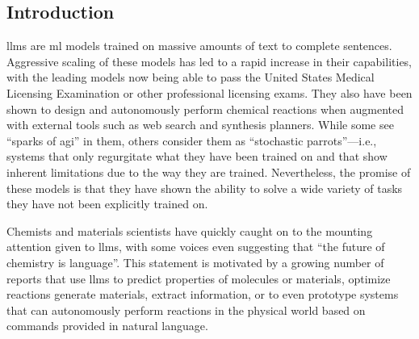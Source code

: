 \documentclass[11pt, oneside]{article}
\begin{document}
\clearpage
\begin{refsection}
\section{Introduction}
\Glspl{llm} are \gls{ml} models trained on massive amounts of text to complete sentences. 
Aggressive scaling of these models has led to a rapid increase in their capabilities,\autocite{brown2020language,zhong2024benchmarking} with the leading models now being able to pass the United States Medical Licensing Examination\autocite{kung2023performance} or other professional licensing exams.
They also have been shown to design and autonomously perform chemical reactions when augmented with external tools such as web search and synthesis planners.\autocite{openai2024gpt4, Boiko_2023, bran2023chemcrow, darvish2024organa}
While some see \enquote{sparks of \gls{agi}} in them,\autocite{bubeck2023sparks} others consider them as \enquote{stochastic parrots}---i.e., systems that only regurgitate what they have been trained on\autocite{bender2021dangers} and that show inherent limitations due to the way they are trained.\autocite{mccoy2023embersautoregressionunderstandinglarge}
Nevertheless, the promise of these models is that they have shown the ability to solve a wide variety of tasks they have not been explicitly trained on.\autocite{bommasani2021opportunities, anderljung2023frontier, ai4science2023impact}

Chemists and materials scientists have quickly caught on to the mounting attention given to \glspl{llm}, with some voices even suggesting that \enquote{the future of chemistry is language}.\autocite{White_2023}
This statement is motivated by a growing number of reports that use \glspl{llm} to predict properties of molecules or materials,\autocite{jablonka202314, jablonka2024leveraging, xie2024fine, liao2024words, zhang2024chemllm, zhong2024benchmarking}  optimize reactions\autocite{ramos2023bayesian, kristiadi2024sober}  generate materials,\autocite{rubungo2023llm, flam2023language, gruver2024fine, alampara2024mattextlanguagemodelsneed} extract information,\autocite{Patiny_2023, Dagdelen_2024, Zheng_2024, lala2023paperqa, caufield2023structured, gupta2022discomat, schillingwilhelmi2024textinsightlargelanguage, skarlinski2024language} or to even prototype systems that can autonomously perform reactions in the physical world based on commands provided in natural language.\autocite{bran2023chemcrow, Boiko_2023, darvish2024organa}


\end{refsection}
\end{document}
